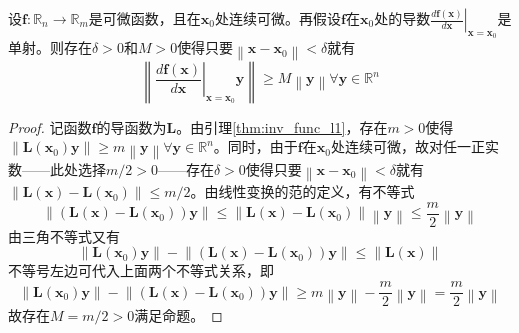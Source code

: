 \documentclass[main.tex]{subfiles}
\begin{document}
\begin{lemma}\label{thm:inv_func_l2}
设$\mathbf{f}:\mathbb{R}_n\rightarrow\mathbb{R}_m$是可微函数，且在$\mathbf{x}_0$处连续可微。再假设$\mathbf{f}$在$\mathbf{x}_0$处的导数$\left.\frac{d\mathbf{f}\left(\mathbf{x}\right)}{d\mathbf{x}}\right|_{\mathbf{x}=\mathbf{x}_0}$是单射。则存在$\delta>0$和$M>0$使得只要$\left\|\mathbf{x}-\mathbf{x}_0\right\|<\delta$就有
\[
\left\|\left.\frac{d\mathbf{f}\left(\mathbf{x}\right)}{d\mathbf{x}}\right|_{\mathbf{x}=\mathbf{x}_0}\mathbf{y}\right\|\geq M\left\|\mathbf{y}\right\|\forall\mathbf{y}\in\mathbb{R}^n
\]
\end{lemma}
\begin{proof}
记函数$\mathbf{f}$的导函数为$\mathbf{L}$。由引理\ref{thm:inv_func_l1}，存在$m>0$使得$\left\|\mathbf{L}\left(\mathbf{x}_0\right)\mathbf{y}\right\|\geq m\left\|\mathbf{y}\right\|\forall\mathbf{y}\in\mathbb{R}^n$。同时，由于$\mathbf{f}$在$\mathbf{x}_0$处连续可微，故对任一正实数——此处选择$m/2>0$——存在$\delta>0$使得只要$\left\|\mathbf{x}-\mathbf{x}_0\right\|<\delta$就有$\left\|\mathbf{L}\left(\mathbf{x}\right)-\mathbf{L}\left(\mathbf{x}_0\right)\right\|\leq m/2$。由线性变换的范的定义，有不等式
\[
\left\|\left(\mathbf{L}\left(\mathbf{x}\right)-\mathbf{L}\left(\mathbf{x}_0\right)\right)\mathbf{y}\right\|\leq\left\|\mathbf{L}\left(\mathbf{x}\right)-\mathbf{L}\left(\mathbf{x}_0\right)\right\|\left\|\mathbf{y}\right\|\leq\frac{m}{2}\left\|\mathbf{y}\right\|\]
由三角不等式又有
\[
\left\|\mathbf{L}\left(\mathbf{x}_0\right)\mathbf{y}\right\|-\left\|\left(\mathbf{L}\left(\mathbf{x}\right)-\mathbf{L}\left(\mathbf{x}_0\right)\right)\mathbf{y}\right\|\leq\left\|\mathbf{L}\left(\mathbf{x}\right)\right\|\]
不等号左边可代入上面两个不等式关系，即
\[
\left\|\mathbf{L}\left(\mathbf{x}_0\right)\mathbf{y}\right\|-\left\|\left(\mathbf{L}\left(\mathbf{x}\right)-\mathbf{L}\left(\mathbf{x}_0\right)\right)\mathbf{y}\right\|\geq m\left\|\mathbf{y}\right\|-\frac{m}{2}\left\|\mathbf{y}\right\|=\frac{m}{2}\left\|\mathbf{y}\right\|
\]
故存在$M=m/2>0$满足命题。
\end{proof}
\end{document}

